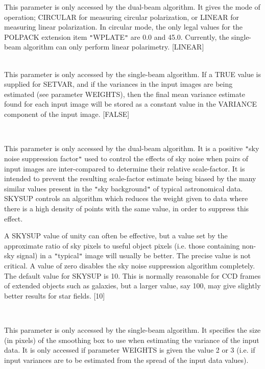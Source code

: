 \documentclass[twoside,11pt]{article}
\renewcommand{\_}{\texttt{\symbol{95}}}
\newcommand{\sstsubsection}[1]{ \item[{#1}] \mbox{} \\}
\newcommand{\sstsubsection}[1]{\item[{#1}]}
\begin{document}
{{{      }{
         This parameter is only accessed by the dual-beam algorithm. It
         gives the mode of operation; CIRCULAR for measuring circular
         polarization, or LINEAR for measuring linear polarization. In
         circular mode, the only legal values for the POLPACK extension
         item {\tt "}WPLATE{\tt "} are 0.0 and 45.0. Currently, the single-beam algorithm
         can only perform linear polarimetry. [LINEAR]
      }
      \sstsubsection{
         SETVAR = \_REAL (Read)
      }{
         This parameter is only accessed by the single-beam algorithm.
         If a TRUE value is supplied for SETVAR, and if the variances in
         the input images are being estimated (see parameter WEIGHTS), then
         the final mean variance estimate found for each input image will
         be stored as a constant value in the VARIANCE component of the input
         image. [FALSE]
      }
      \sstsubsection{
         SKYSUP = \_REAL (Read)
      }{
         This parameter is only accessed by the dual-beam algorithm. It is
         a positive {\tt "}sky noise suppression factor{\tt "} used to control the
         effects of sky noise when pairs of input images are
         inter-compared to determine their relative scale-factor. It is
         intended to prevent the resulting scale-factor estimate being
         biased by the many similar values present in the {\tt "}sky
         background{\tt "} of typical astronomical data.  SKYSUP controls an
         algorithm which reduces the weight given to data where there
         is a high density of points with the same value, in order to
         suppress this effect.

         A SKYSUP value of unity can often be effective, but a value
         set by the approximate ratio of sky pixels to useful object
         pixels (i.e. those containing non-sky signal) in a {\tt "}typical{\tt "}
         image will usually be better. The precise value
         is not critical. A value of zero disables the sky noise
         suppression algorithm completely. The default value for SKYSUP
         is 10. This is normally reasonable for CCD frames of extended
         objects such as galaxies, but a larger value, say 100, may give
         slightly better results for star fields. [10]
      }
      \sstsubsection{
         SMBOX = \_INTEGER (Read)
      }{
         This parameter is only accessed by the single-beam algorithm. It
         specifies the size (in pixels) of the smoothing box to use
         when estimating the variance of the input data. It is only
         accessed if parameter WEIGHTS is given the value 2 or 3 (i.e. if
         input variances are to be estimated from the spread of the input
         data values).

}}}
\end{document}
